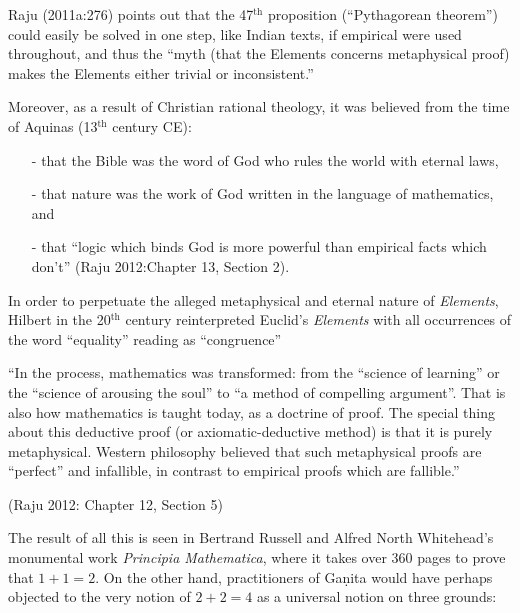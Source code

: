 Raju (2011a:276) points out that the 47$^{\text{th}}$ proposition (``Pythagorean theorem'') could easily be solved in one step, like Indian texts, if empirical were used throughout, and thus the ``myth (that the Elements concerns metaphysical proof) makes the Elements either trivial or inconsistent.''

Moreover, as a result of Christian rational theology, it was believed from the time of Aquinas (13$^{\text{th}}$ century CE): 

\newpage

\begin{itemize}
\item[-] that the Bible was the word of God who rules the world with eternal laws,
\item[-] that nature was the work of God written in the language of mathematics, and 
\item[-] that ``logic which binds God is more powerful than empirical facts which don’t'' (Raju 2012:Chapter 13, Section 2). 
\end{itemize}

In order to perpetuate the alleged metaphysical and eternal nature of {\sl Elements}, Hilbert in the 20$^{\text{th}}$ century reinterpreted Euclid’s {\sl Elements} with all occurrences of the word ``equality'' reading as ``congruence''

\begin{myquote}
``In the process, mathematics was transformed: from the ``science of learning'' or the ``science of arousing the soul'' to ``a method of compelling argument''. That is also how mathematics is taught today, as a doctrine of proof. The special thing about this deductive proof (or axiomatic-deductive method) is that it is purely metaphysical. Western philosophy believed that such metaphysical proofs are ``perfect'' and infallible, in contrast to empirical proofs which are fallible.''

\hfill 	(Raju 2012: Chapter 12, Section 5)
\end{myquote}

The result of all this is seen in Bertrand Russell and Alfred North Whitehead's monumental work {\sl Principia Mathematica}, where it takes over 360 pages to prove that $1 + 1 = 2$. On the other hand, practitioners of Gaṇita would have perhaps objected to the very notion of $2 + 2 =4$ as a universal notion on three grounds:

